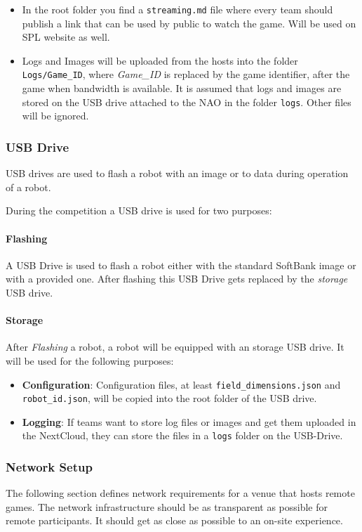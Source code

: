 \begin{itemize}
    \item In the root folder you find a \texttt{streaming.md} file where every team should publish a link that can be used by public to watch the game. Will be used on SPL website as well.
	\item Logs and Images will be uploaded from the hosts into the folder \texttt{Logs/Game\_ID}, where \textit{Game\_ID} is replaced by the game identifier, after the game when bandwidth is available. It is assumed that logs and images are stored on the USB drive attached to the NAO in the folder \texttt{logs}. Other files will be ignored. 

\end{itemize}

\subsubsection{USB Drive}
\label{sec:c3_USB_Drive}
USB drives are used to flash a robot with an image or to data during operation of a robot.

During the competition a USB drive is used for two purposes:

\paragraph*{Flashing}
A USB Drive is used to flash a robot either with the standard SoftBank image or with a provided one. After flashing this USB Drive gets replaced by the \textit{storage} USB drive.

\paragraph*{Storage}
After \textit{Flashing} a robot, a robot will be equipped with an storage USB drive. It will be used for the following purposes:

\begin{itemize}
	\item \textbf{Configuration}: Configuration files, at least \texttt{field\_dimensions.json} and \texttt{robot\_id.json}, will be copied into the root folder of the USB drive. 
	\item  \textbf{Logging}: If teams want to store log files or images and get them uploaded in the NextCloud, they can store the files in a \texttt{logs} folder on the USB-Drive. 
\end{itemize}

\subsubsection{Network Setup}
The following section defines network requirements for a venue that hosts remote games. The network infrastructure should be as transparent as possible for remote participants. It should get as close as possible to an on-site experience.

